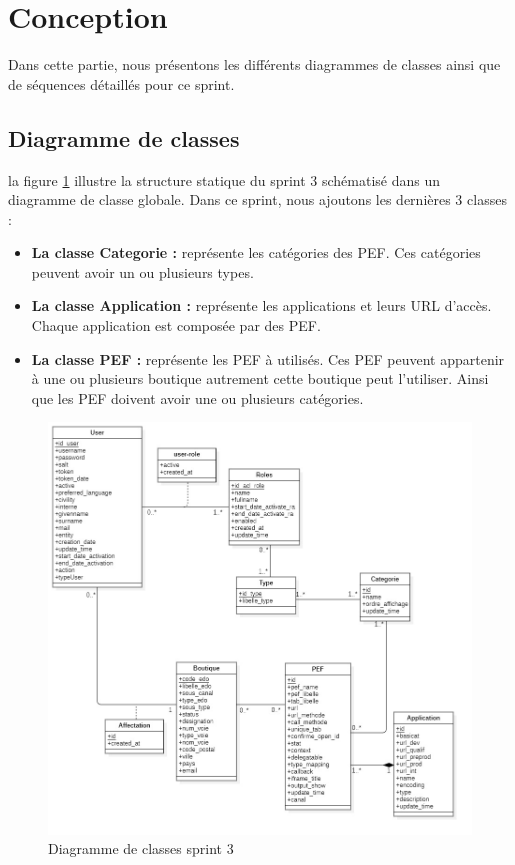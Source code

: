 \section{Conception}
Dans cette partie, nous présentons les différents diagrammes de classes ainsi que de séquences détaillés pour ce sprint. 


\subsection{Diagramme de classes}
la figure \ref{fig:classdiag-sprint3} illustre la structure statique du sprint 3 schématisé dans un diagramme de classe globale.
Dans ce sprint, nous ajoutons les dernières 3 classes :
\begin{itemize}
	\item \textbf{La classe Categorie :} représente les catégories des PEF. Ces catégories peuvent avoir un ou plusieurs types.
	\item \textbf{La classe Application :} représente les applications et leurs URL d'accès. Chaque application est composée par des PEF.
	\item \textbf{La classe PEF :} représente les PEF à utilisés. Ces PEF peuvent appartenir à une ou plusieurs boutique autrement cette boutique peut l'utiliser. Ainsi que les PEF doivent avoir une ou plusieurs catégories. 
\end{itemize}
\begin{figure}[H]
	\centering
	\includegraphics[width=1\linewidth]{img/conception/classes/ClassDiag-sprint3}
	\caption[Diagramme de classes sprint 3]{Diagramme de classes sprint 3}
	\label{fig:classdiag-sprint3}
\end{figure}

